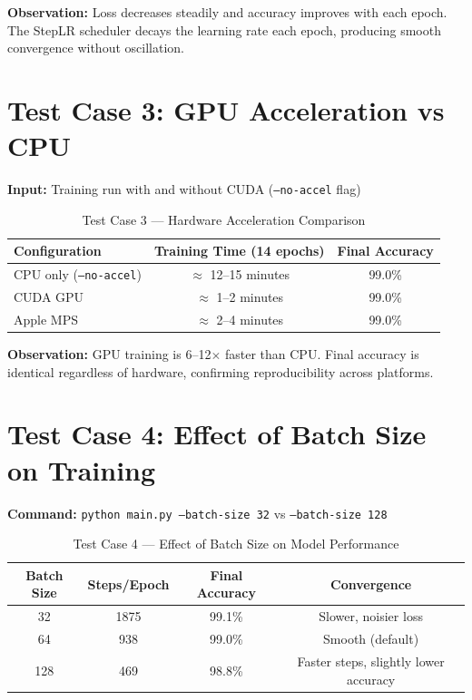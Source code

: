 \documentclass[12pt,a4paper,openany]{report}
\begin{document}
\textbf{Observation:} Loss decreases steadily and accuracy improves with each epoch. The StepLR scheduler decays the learning rate each epoch, producing smooth convergence without oscillation.

\section{Test Case 3: GPU Acceleration vs CPU}

\textbf{Input:} Training run with and without CUDA (\texttt{--no-accel} flag)

\begin{table}[H]
\centering
\begin{tabular}{|l|c|c|}
\hline
\textbf{Configuration} & \textbf{Training Time (14 epochs)} & \textbf{Final Accuracy} \\
\hline
CPU only (\texttt{--no-accel}) & $\approx$ 12--15 minutes & 99.0\% \\
CUDA GPU                        & $\approx$ 1--2 minutes   & 99.0\% \\
Apple MPS                       & $\approx$ 2--4 minutes   & 99.0\% \\
\hline
\end{tabular}
\caption{Test Case 3 --- Hardware Acceleration Comparison}
\end{table}

\textbf{Observation:} GPU training is 6--12$\times$ faster than CPU. Final accuracy is identical regardless of hardware, confirming reproducibility across platforms.

\section{Test Case 4: Effect of Batch Size on Training}

\textbf{Command:} \texttt{python main.py --batch-size 32} vs \texttt{--batch-size 128}

\begin{table}[H]
\centering
\begin{tabular}{|c|c|c|c|}
\hline
\textbf{Batch Size} & \textbf{Steps/Epoch} & \textbf{Final Accuracy} & \textbf{Convergence} \\
\hline
32  & 1875 & 99.1\% & Slower, noisier loss \\
64  & 938  & 99.0\% & Smooth (default) \\
128 & 469  & 98.8\% & Faster steps, slightly lower accuracy \\
\hline
\end{tabular}
\caption{Test Case 4 --- Effect of Batch Size on Model Performance}
\end{table}
\end{document}
